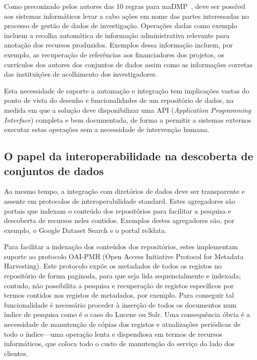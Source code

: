 \documentclass[sigconf,nonacm]{acmart}
\begin{document}
Como preconizado pelos autores das 10 regras para maDMP~\cite{miksa_tomasz_2018_1172673}, deve ser possível aos sistemas informáticos levar a cabo ações em nome das partes interessadas no processo de gestão de dados de investigação. Operações dadas como exemplo incluem a recolha automática de informação administrativa relevante para anotação dos recursos produzidos. Exemplos dessa informação incluem, por exemplo, as recuperação de referências aos financiadores dos projetos, os currículos dos autores dos conjuntos de dados assim como as informações corretas das instituições de acolhimento dos investigadores. 

Esta necessidade de suporte a automação e integração tem implicações vastas do ponto de vista do desenho e funcionalidades de um repositório de dados, na medida em que a solução deve disponibilizar uma API (\textit{Application Programming Interface}) completa e bem documentada, de forma a permitir a sistemas externos executar estas operações sem a necessidade de intervenção humana.

\subsection{O papel da interoperabilidade na descoberta de conjuntos de dados}

Ao mesmo tempo, a integração com diretórios de dados deve ser transparente e assente em protocolos de interoperabilidade standard. Estes agregadores são portais que indexam o conteúdo dos repositórios para facilitar a pesquisa e descoberta de recursos neles contidos. Exemplos destes agregadores são, por exemplo, o Google Dataset Search e o portal re3data. 

Para facilitar a indexação dos conteúdos dos repositórios, estes implementam suporte ao protocolo OAI-PMH (Open Access Initiative Protocol for Metadata Harvesting). Este protocolo expõe os metadados de todos os registos no repositório de forma paginada, para que seja lida sequencialmente e indexada; contudo, não possibilita a pesquisa e recuperação de registos específicos por termos contidos nos registos de metadados, por exemplo. Para conseguir tal funcionalidade é necessário proceder à inserção de todos os documentos num índice de pesquisa como é o caso do Lucene ou Solr. Uma consequência óbvia é a necessidade de manutenção de cópias dos registos e atualizações periódicas de todo o índice---uma operação lenta e dispendiosa em termos de recursos informáticos, que coloca todo o custo de manutenção do serviço do lado dos clientes.
\end{document}
